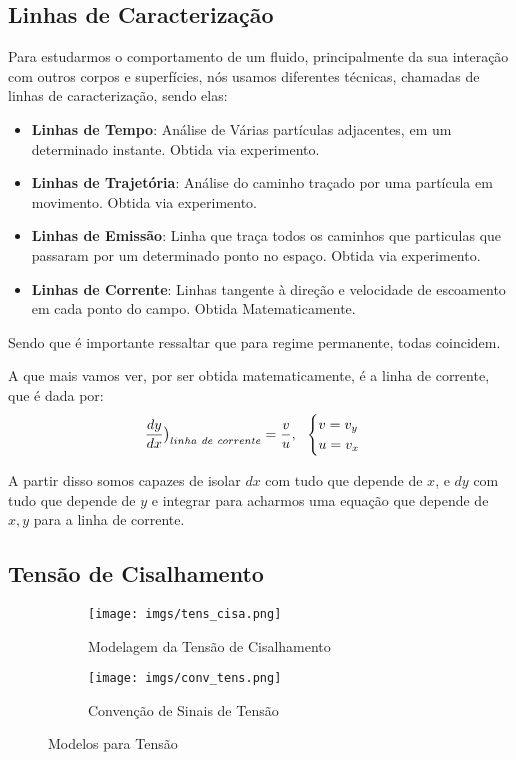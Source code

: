 \documentclass{article}
\begin{document}
\subsection{Linhas de Caracterização}
Para estudarmos o comportamento de um fluido, principalmente da sua interação com outros corpos e superfícies, nós usamos diferentes técnicas, chamadas de linhas de caracterização, sendo
elas:
\begin{itemize}
    \item \textbf{Linhas de Tempo}: Análise de Várias partículas adjacentes, em um determinado instante. Obtida via experimento.
    \item \textbf{Linhas de Trajetória}: Análise do caminho traçado por uma partícula em movimento. Obtida via experimento.
    \item \textbf{Linhas de Emissão}: Linha que traça todos os caminhos que particulas que passaram por um determinado ponto no espaço. Obtida via experimento.
    \item \textbf{Linhas de Corrente}: Linhas tangente à direção e velocidade de escoamento em cada ponto do campo. Obtida Matematicamente.
\end{itemize}

Sendo que é importante ressaltar que para regime permanente, todas coincidem.

A que mais vamos ver, por ser obtida matematicamente, é a linha de corrente, que é dada por:
\begin{align}
    \frac{dy}{dx} \big{)}_{linha \ de \ corrente} = \frac{v}{u}, \ \ \begin{cases}
                                                                         v = v_y \\
                                                                         u = v_x
                                                                     \end{cases}
\end{align}

A partir disso somos capazes de isolar $dx$ com tudo que depende de $x$, e $dy$ com tudo que depende de $y$ e integrar para acharmos uma equação que depende de $x,y$ para a linha de
corrente.

\subsection{Tensão de Cisalhamento}

\begin{figure}[H]
    \begin{subfigure}{0.5\textwidth}
        \centering
        \texttt{[image: imgs/tens\_cisa.png]}
        \caption{Modelagem da Tensão de Cisalhamento}\label{img:tens_cis}
    \end{subfigure}%
    \begin{subfigure}{.5\textwidth}
        \centering
        \texttt{[image: imgs/conv\_tens.png]}
        \caption{Convenção de Sinais de Tensão}\label{img:conv_sinais}
    \end{subfigure}
    \caption[]{Modelos para Tensão}
\end{figure}
\end{document}
